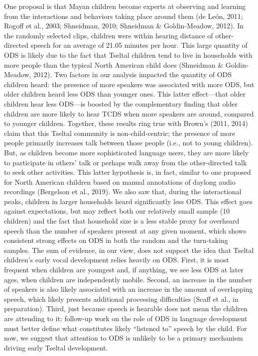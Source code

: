 \documentclass[floatsintext,man]{apa6}
\theoremstyle{definition}
\theoremstyle{definition}
\theoremstyle{definition}
\theoremstyle{remark}
\begin{document}
One proposal is that Mayan children become experts at observing and
learning from the interactions and behaviors taking place around them
(de León, 2011; Rogoff et al., 2003; Shneidman, 2010; Shneidman \&
Goldin-Meadow, 2012). In the randomly selected clips, children were
within hearing distance of other-directed speech for an average of 21.05
minutes per hour. This large quantity of ODS is likely due to the fact
that Tseltal children tend to live in households with more people than
the typical North American child does (Shneidman \& Goldin-Meadow,
2012). Two factors in our analysis impacted the quantity of ODS children
heard: the presence of more speakers was associated with more ODS, but
older children heard less ODS than younger ones. This latter
effect---that older children hear less ODS---is boosted by the
complementary finding that older children are more likely to hear TCDS
when more speakers are around, compared to younger children. Together,
these results ring true with Brown's (2011, 2014) claim that this
Tseltal community is non-child-centric; the presence of more people
primarily increases talk between those people (i.e., not to young
children). But, as children become more sophisticated language users,
they are more likely to participate in others' talk or perhaps walk away
from the other-directed talk to seek other activities. This latter
hypothesis is, in fact, similar to one proposed for North American
children based on manual annotations of daylong audio recordings
(Bergelson et al., 2019). We also saw that, during the interactional
peaks, children in larger households heard significantly less ODS. This
effect goes against expectations, but may reflect both our relatively
small sample (10 children) and the fact that household size is a less
stable proxy for overheard speech than the number of speakers present at
any given moment, which shows consistent strong effects on ODS in both
the random and the turn-taking samples. The sum of evidence, in our
view, does not support the idea that Tseltal children's early vocal
development relies heavily on ODS. First, it is most frequent when
children are youngest and, if anything, we see less ODS at later ages,
when children are independently mobile. Second, an increase in the
number of speakers is also likely associated with an increase in the
amount of overlapping speech, which likely presents additional
processing difficulties (Scaff et al., in preparation). Third, just
because speech is hearable does not mean the children are attending to
it; follow-up work on the role of ODS in language development must
better define what constitutes likely \enquote{listened to} speech by
the child. For now, we suggest that attention to ODS is unlikely to be a
primary mechanism driving early Tseltal development.
\end{document}

